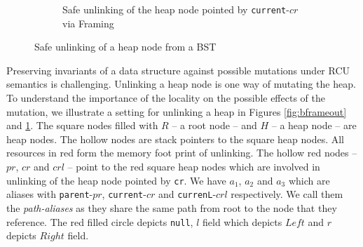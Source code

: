 \begin{figure}[H]
\begin{subfigure}[b]{.4\linewidth}

 \caption{Safe unlinking of the heap node pointed by \texttt{current}-$cr$ via \textsf{Framing}}
 \label{fig:bunlinkframeout}
\end{subfigure}
\caption{Safe unlinking of a heap node from a \textsf{BST}}
 \label{fig:unlkappndx}\vspace{-2mm}
 \end{figure}

Preserving invariants of a data structure against possible mutations under \textsf{RCU} semantics is challenging. Unlinking a heap node is one way of mutating the heap. To understand the importance of the locality on the possible effects of the mutation, we illustrate a setting for unlinking a heap in Figures  \ref{fig:bframeout} and \ref{fig:bunlinkframeout}. The square nodes filled with $R$ -- a root node -- and $H$ -- a heap node -- are heap nodes. The hollow nodes are stack pointers to the square heap nodes. All resources in red form the memory foot print of unlinking. The hollow red nodes -- $pr$, $cr$ and $crl$ -- point to the red square heap nodes which are involved in unlinking of the heap node pointed by \texttt{cr}. We have $a_1$, $a_2$ and $a_3$ which are aliases with \texttt{parent}-$pr$, \texttt{current}-$cr$ and \texttt{currenL}-$crl$ respectively. We call them the \textit{path-aliases} as they share the same path from root to the node that they reference. The red filled circle depicts \texttt{null}, $l$ field which depicts $Left$ and $r$ depicts $Right$ field.

